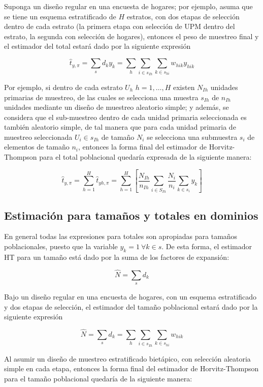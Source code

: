 \documentclass[
  12pt,
]{book}
\begin{document}
Suponga un diseño regular en una encuesta de hogares; por ejemplo, asuma que se tiene un esquema estratificado de \(H\) estratos, con dos etapas de selección dentro de cada estrato (la primera etapa con selección de UPM dentro del estrato, la segunda con selección de hogares), entonces el peso de muestreo final y el estimador del total estará dado por la siguiente expresión

\[
\hat{t}_{y, \pi} = \sum_s d_k y_k = \sum_h \sum_{i \in s_{Ih}} \sum_{k \in s_{hi}}  w_{hik} y_{hik}
\]

Por ejemplo, si dentro de cada estrato \(U_h\) \(h=1,\ldots, H\) existen \(N_{Ih}\) unidades primarias de muestreo, de las cuales se selecciona una muestra \(s_{Ih}\) de \(n_{Ih}\) unidades mediante un diseño de muestreo aleatorio simple; y además, se considera que el sub-muestreo dentro de cada unidad primaria seleccionada es también aleatorio simple, de tal manera que para cada unidad primaria de muestreo seleccionada \(U_i\in s_{Ih}\) de tamaño \(N_i\) se selecciona una submuestra \(s_i\) de elementos de tamaño \(n_i\), entonces la forma final del estimador de Horvitz-Thompson para el total poblacional quedaría expresada de la siguiente manera:

\[
\hat{t}_{y,\pi}=\sum_{h=1}^H\hat{t}_{yh,\pi}=\sum_{h=1}^H\left[\frac{N_{Ih}}{n_{Ih}}\sum_{i\in S_{Ih}}\frac{N_i}{n_i}\sum_{k\in s_i}y_k\right]
\]

\hypertarget{estimaciuxf3n-para-tamauxf1os-y-totales-en-dominios}{%
\subsection{Estimación para tamaños y totales en dominios}\label{estimaciuxf3n-para-tamauxf1os-y-totales-en-dominios}}

En general todas las expresiones para totales son apropiadas para tamaños poblacionales, puesto que la variable \(y_k = 1 \ \forall k \in s\). De esta forma, el estimador HT para un tamaño está dado por la suma de los factores de expansión:

\[
\hat{N} = \sum_s d_k 
\]

Bajo un diseño regular en una encuesta de hogares, con un esquema estratificado y dos etapas de selección, el estimador del tamaño poblacional estará dado por la siguiente expresión

\[
\hat{N} = \sum_s d_k = \sum_h \sum_{i \in s_{Ih}} \sum_{k \in s_{hi}}  w_{hik} 
\]

Al asumir un diseño de muestreo estratificado bietápico, con selección aleatoria simple en cada etapa, entonces la forma final del estimador de Horvitz-Thompson para el tamaño poblacional quedaría de la siguiente manera:
\end{document}
